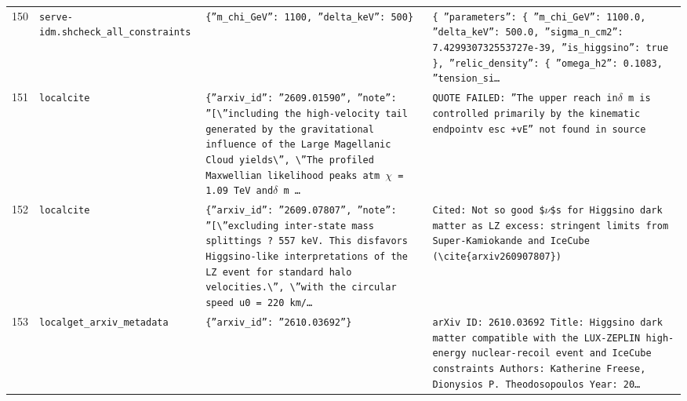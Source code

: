 \documentclass[11pt,a4paper]{article}
\begin{document}
\begin{longtable}{@{}p{}p{}p{}p{}@{}}
150 & \texttt{serve-idm.sh}\newline\texttt{check\_\allowbreak{}all\_\allowbreak{}constraints} & \texttt{\{''m\_\allowbreak{}chi\_\allowbreak{}GeV'':\allowbreak{} 1100,\allowbreak{} ''delta\_\allowbreak{}keV'':\allowbreak{} 500\}\allowbreak{}} & \texttt{\{   ''parameters'':\allowbreak{} \{     ''m\_\allowbreak{}chi\_\allowbreak{}GeV'':\allowbreak{} 1100.0,\allowbreak{}     ''delta\_\allowbreak{}keV'':\allowbreak{} 500.0,\allowbreak{}     ''sigma\_\allowbreak{}n\_\allowbreak{}cm2'':\allowbreak{} 7.429930732553727e-39,\allowbreak{}     ''is\_\allowbreak{}higgsino'':\allowbreak{} true   \}\allowbreak{},\allowbreak{}   ''relic\_\allowbreak{}density'':\allowbreak{} \{     ''omega\_\allowbreak{}h2'':\allowbreak{} 0.1083,\allowbreak{}     ''tension\_\allowbreak{}si\ldots{}\allowbreak{}} \\
151 & \texttt{local}\newline\texttt{cite} & \texttt{\{''arxiv\_\allowbreak{}id'':\allowbreak{} ''2609.01590'',\allowbreak{} ''note'':\allowbreak{} ''[\textbackslash{}\allowbreak{}''including the high-velocity tail generated by the gravitational influence of the Large Magellanic Cloud yields\textbackslash{}\allowbreak{}'',\allowbreak{} \textbackslash{}\allowbreak{}''The profiled Maxwellian likelihood peaks atm $\chi$ =\allowbreak{} 1.09 TeV and$\delta$ m \ldots{}\allowbreak{}} & \texttt{QUOTE FAILED:\allowbreak{} ''The upper reach in$\delta$ m is controlled primarily by the kinematic endpointv esc +vE'' not found in source} \\
152 & \texttt{local}\newline\texttt{cite} & \texttt{\{''arxiv\_\allowbreak{}id'':\allowbreak{} ''2609.07807'',\allowbreak{} ''note'':\allowbreak{} ''[\textbackslash{}\allowbreak{}''excluding inter-state mass splittings ? 557 keV. This disfavors Higgsino-like interpretations of the LZ event for standard halo velocities.\textbackslash{}\allowbreak{}'',\allowbreak{} \textbackslash{}\allowbreak{}''with the circular speed u0 =\allowbreak{} 220 km/\allowbreak{}\ldots{}\allowbreak{}} & \texttt{Cited:\allowbreak{} Not so good \$$\nu$\$s for Higgsino dark matter as LZ excess:\allowbreak{} stringent limits from Super-Kamiokande and IceCube (\textbackslash{}\allowbreak{}cite\{arxiv260907807\}\allowbreak{})\allowbreak{}} \\
153 & \texttt{local}\newline\texttt{get\_\allowbreak{}arxiv\_\allowbreak{}metadata} & \texttt{\{''arxiv\_\allowbreak{}id'':\allowbreak{} ''2610.03692''\}\allowbreak{}} & \texttt{arXiv ID:\allowbreak{} 2610.03692 Title:\allowbreak{} Higgsino dark matter compatible with the LUX-ZEPLIN high-energy nuclear-recoil event and IceCube constraints Authors:\allowbreak{} Katherine Freese,\allowbreak{} Dionysios P. Theodosopoulos Year:\allowbreak{} 20\ldots{}\allowbreak{}} \\

\end{longtable}
\end{document}
